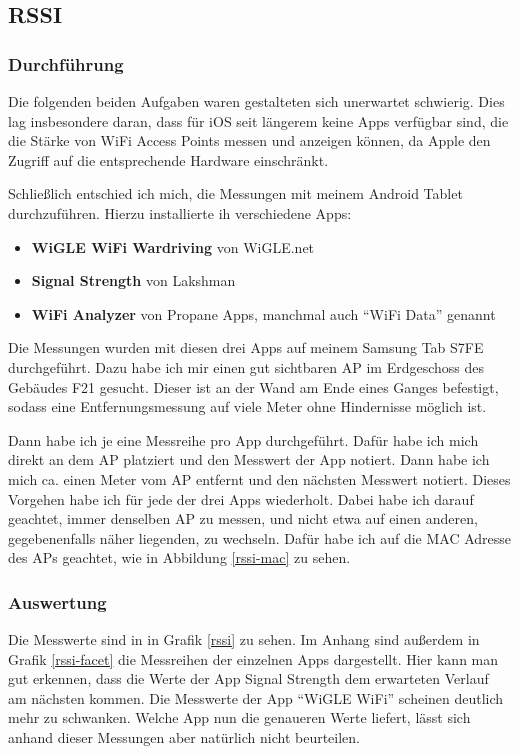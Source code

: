 \subsection{RSSI}
\label{sec:rssi}

\subsubsection*{Durchführung}
Die folgenden beiden Aufgaben waren gestalteten sich unerwartet schwierig. Dies lag insbesondere daran, dass für iOS seit längerem keine Apps verfügbar sind, die die Stärke von WiFi Access Points messen und anzeigen können, da Apple den Zugriff auf die entsprechende Hardware einschränkt.

Schließlich entschied ich mich, die Messungen mit meinem Android Tablet durchzuführen. Hierzu installierte ih verschiedene Apps:

\begin{itemize}
    \item \textbf{WiGLE WiFi Wardriving} von WiGLE.net
    \item \textbf{Signal Strength} von Lakshman
    \item \textbf{WiFi Analyzer} von Propane Apps, manchmal auch \enquote{WiFi Data} genannt
\end{itemize}

Die Messungen wurden mit diesen drei Apps auf meinem Samsung Tab S7FE durchgeführt. Dazu habe ich mir einen gut sichtbaren AP im Erdgeschoss des Gebäudes F21 gesucht. Dieser ist an der Wand am Ende eines Ganges befestigt, sodass eine Entfernungsmessung auf viele Meter ohne Hindernisse möglich ist.

Dann habe ich je eine Messreihe pro App durchgeführt. Dafür habe ich mich direkt an dem AP platziert und den Messwert der App notiert. Dann habe ich mich ca. einen Meter vom AP entfernt und den nächsten Messwert notiert. Dieses Vorgehen habe ich für jede der drei Apps wiederholt. Dabei habe ich darauf geachtet, immer denselben AP zu messen, und nicht etwa auf einen anderen, gegebenenfalls näher liegenden, zu wechseln. Dafür habe ich auf die MAC Adresse des APs geachtet, wie in Abbildung \ref{rssi-mac} zu sehen.

\subsubsection*{Auswertung}

Die Messwerte sind in in Grafik \ref{rssi} zu sehen. Im Anhang sind außerdem in Grafik \ref{rssi-facet} die Messreihen der einzelnen Apps dargestellt. Hier kann man gut erkennen, dass die Werte der App Signal Strength dem erwarteten Verlauf am nächsten kommen. Die Messwerte der App \enquote{WiGLE WiFi} scheinen deutlich mehr zu schwanken. Welche App nun die genaueren Werte liefert, lässt sich anhand dieser Messungen aber natürlich nicht beurteilen.


